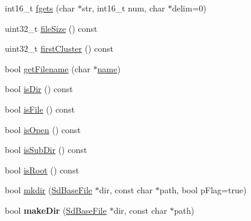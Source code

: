\begin{DoxyCompactItemize}
\item 
int16\+\_\+t \hyperlink{class_sd_base_file_a41de4f35c622c1a5f5699400e8d05a87}{fgets} (char $\ast$str, int16\+\_\+t num, char $\ast$delim=0)
\item 
uint32\+\_\+t \hyperlink{class_sd_base_file_a32ac452756fdf80aae75fb1ab093a421}{file\+Size} () const 
\item 
uint32\+\_\+t \hyperlink{class_sd_base_file_adca5f8fce7851f9b7abc92cb73e49e35}{first\+Cluster} () const 
\item 
bool \hyperlink{class_sd_base_file_a2e84ccce858fd7e4d88e26b23d19a822}{get\+Filename} (char $\ast$\hyperlink{_sd_fat_structs_8h_a30308c9b983377042fd2cc8900454fb1}{name})
\item 
bool \hyperlink{class_sd_base_file_ad43ed061a1f77578d3c30a0f9b198497}{is\+Dir} () const 
\item 
bool \hyperlink{class_sd_base_file_ab57b9744531ee0fcfa18bebde9fc50db}{is\+File} () const 
\item 
bool \hyperlink{class_sd_base_file_a0fb6e697de39cdb777744981f58eaaa8}{is\+Open} () const 
\item 
bool \hyperlink{class_sd_base_file_a50023837ddbc57b10098d3a7cd5856f7}{is\+Sub\+Dir} () const 
\item 
bool \hyperlink{class_sd_base_file_ad1fcdcb6c1cb66207d243584e6049095}{is\+Root} () const 
\item 
bool \hyperlink{class_sd_base_file_ad1de34e5dc5b3a1727208f949b5838e9}{mkdir} (\hyperlink{class_sd_base_file}{Sd\+Base\+File} $\ast$dir, const char $\ast$path, bool p\+Flag=true)
\item 
bool {\bfseries make\+Dir} (\hyperlink{class_sd_base_file}{Sd\+Base\+File} $\ast$dir, const char $\ast$path)\hypertarget{class_sd_base_file_a029e3d5790521cfadcd081e28172afad}{}\label{class_sd_base_file_a029e3d5790521cfadcd081e28172afad}


\end{DoxyCompactItemize}
